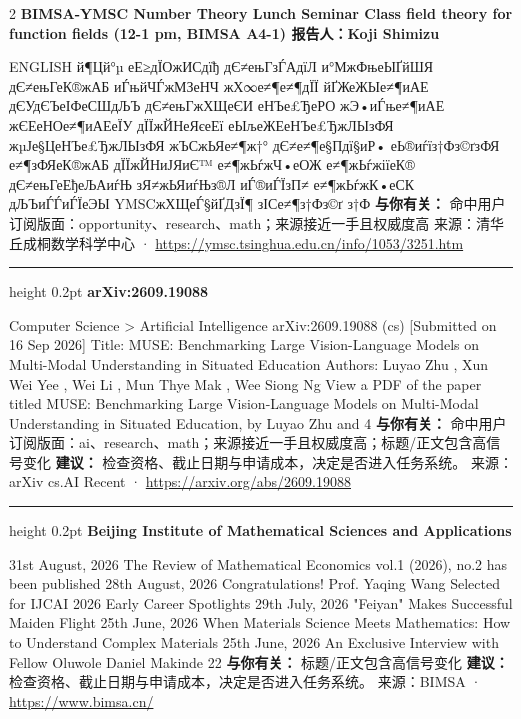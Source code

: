 \documentclass[10.5pt]{ctexart}
\begin{document}
\begin{multicols}{2}
{\large\bfseries BIMSA-YMSC Number Theory Lunch Seminar Class field theory for function fields (12-1 pm, BIMSA A4-1) 报告人：Koji Shimizu}\par
ENGLISH й¶Цй°µ еЕ≥дЇОжИСдїђ дЄ≠ењГзЃАдїЛ и°МжФњеЫҐйШЯ дЄ≠ењГеК®жАБ иЃњйЧЃжМЗеНЧ жХ∞е≠¶е≠¶дЇЇ йҐЖеЖЫе≠¶иАЕ дЄУдЄЪеІФеСШдЉЪ дЄ≠ењГжХЩеЄИ еНЪе£ЂеРО жЭ•иЃње≠¶иАЕ жЄЕеНОе≠¶иАЕеЇУ дЇЇжЙНеЯєеЕї еЫљеЖЕеНЪе£ЂжЛЫзФЯ жµЈе§ЦеНЪе£ЂжЛЫзФЯ жЪСжЬЯе≠¶ж†° дЄ≠е≠¶е§Пдї§иР• еЬ®иѓїз†Фз©ґзФЯ е≠¶зФЯеК®жАБ дЇЇжЙНиЈЯиЄ™ е≠¶жЬѓжЧ•еОЖ е≠¶жЬѓжіїеК® дЄ≠ењГеЕђеЉАиѓЊ зЯ≠жЬЯиѓЊз®Л иЃ®иЃЇзП≠ е≠¶жЬѓжК•еСК дЉЪиЃЃиЃЇеЭЫ YMSCжХЩеЃ§йҐДзЇ¶ зІСе≠¶з†Фз©ґ з†Ф
\textbf{与你有关：} 命中用户订阅版面：opportunity、research、math；来源接近一手且权威度高
{\footnotesize\color{ormuted} 来源：清华丘成桐数学科学中心 · \url{https://ymsc.tsinghua.edu.cn/info/1053/3251.htm}}
\vspace{2mm}
\hrule height 0.2pt
\vspace{2mm}
{\large\bfseries arXiv:2609.19088}\par
Computer Science > Artificial Intelligence arXiv:2609.19088 (cs) [Submitted on 16 Sep 2026] Title: MUSE: Benchmarking Large Vision-Language Models on Multi-Modal Understanding in Situated Education Authors: Luyao Zhu , Xun Wei Yee , Wei Li , Mun Thye Mak , Wee Siong Ng View a PDF of the paper titled MUSE: Benchmarking Large Vision-Language Models on Multi-Modal Understanding in Situated Education, by Luyao Zhu and 4 
\textbf{与你有关：} 命中用户订阅版面：ai、research、math；来源接近一手且权威度高；标题/正文包含高信号变化
\textbf{建议：} 检查资格、截止日期与申请成本，决定是否进入任务系统。
{\footnotesize\color{ormuted} 来源：arXiv cs.AI Recent · \url{https://arxiv.org/abs/2609.19088}}
\vspace{2mm}
\hrule height 0.2pt
\vspace{2mm}
{\large\bfseries Beijing Institute of Mathematical Sciences and Applications}\par
31st August, 2026 The Review of Mathematical Economics vol.1 (2026), no.2 has been published 28th August, 2026 Congratulations! Prof. Yaqing Wang Selected for IJCAI 2026 Early Career Spotlights 29th July, 2026 "Feiyan" Makes Successful Maiden Flight 25th June, 2026 When Materials Science Meets Mathematics: How to Understand Complex Materials 25th June, 2026 An Exclusive Interview with Fellow Oluwole Daniel Makinde 22
\textbf{与你有关：} 标题/正文包含高信号变化
\textbf{建议：} 检查资格、截止日期与申请成本，决定是否进入任务系统。
{\footnotesize\color{ormuted} 来源：BIMSA · \url{https://www.bimsa.cn/}}

\end{multicols}
\end{document}
